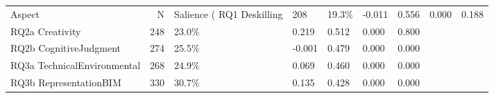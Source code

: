 \begin{tabular}{lrlllll}
\toprule
Aspect & N & Salience (%
\midrule
RQ1 Deskilling & 208 & 19.3\% & -0.011 & 0.556 & 0.000 & 0.188 \\
RQ2a Creativity & 248 & 23.0\% & 0.219 & 0.512 & 0.000 & 0.800 \\
RQ2b CognitiveJudgment & 274 & 25.5\% & -0.001 & 0.479 & 0.000 & 0.000 \\
RQ3a TechnicalEnvironmental & 268 & 24.9\% & 0.069 & 0.460 & 0.000 & 0.000 \\
RQ3b RepresentationBIM & 330 & 30.7\% & 0.135 & 0.428 & 0.000 & 0.000 \\
\bottomrule
\end{tabular}
